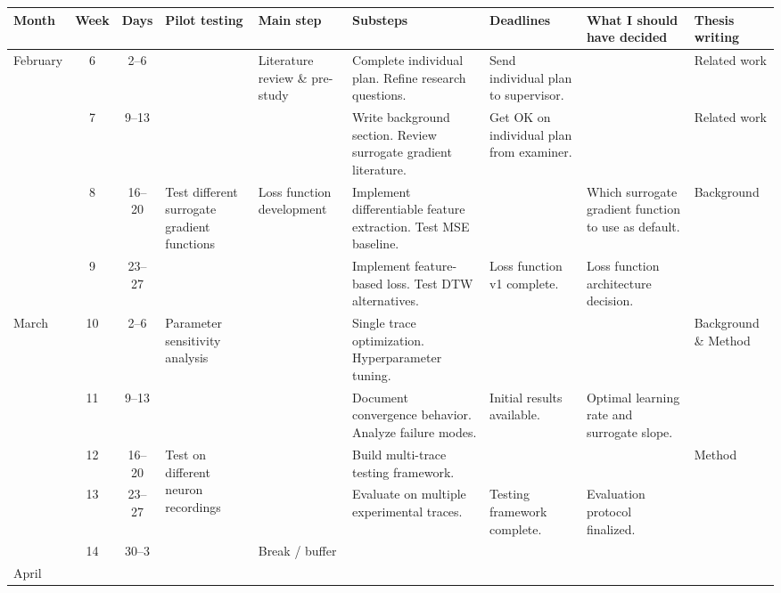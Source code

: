 \documentclass{article}
\begin{document}
\begin{table}[ht]
\centering
\footnotesize
\setlength{\tabcolsep}{3pt}
\begin{tabular}{|p{1.1cm}|c|c|p{2.2cm}|p{2.2cm}|p{2.2cm}|p{2.2cm}|p{2.2cm}|p{2.2cm}|}
\hline
\textbf{Month} & \textbf{Week} & \textbf{Days} & \textbf{Pilot testing} & \textbf{Main step} & \textbf{Substeps} & \textbf{Deadlines} & \textbf{What I should have decided} & \textbf{Thesis writing} \\
\hline
\multirow{4}{*}{February}
& 6 & 2--6 & & \multirow{2}{*}{\parbox{2.2cm}{Literature review \& pre-study}} & Complete individual plan. Refine research questions. & Send individual plan to supervisor. & & Related work \\
\cline{2-4}\cline{6-9}
& 7 & 9--13 & & & Write background section. Review surrogate gradient literature. & Get OK on individual plan from examiner. & & Related work \\
\cline{2-9}
& 8 & 16--20 & \multirow{2}{*}{\parbox{2.2cm}{Test different surrogate gradient functions}} & \multirow{4}{*}{\parbox{2.2cm}{Loss function development}} & Implement differentiable feature extraction. Test MSE baseline. & & Which surrogate gradient function to use as default. & \multirow{2}{*}{Background} \\
\cline{2-3}\cline{6-8}
& 9 & 23--27 & & & Implement feature-based loss. Test DTW alternatives. & Loss function v1 complete. & Loss function architecture decision. & \\
\hline
\multirow{5}{*}{March}
& 10 & 2--6 & \multirow{2}{*}{\parbox{2.2cm}{Parameter sensitivity analysis}} & \multirow{4}{*}{\parbox{2.2cm}{Optimization experiments}} & Single trace optimization. Hyperparameter tuning. & & & \multirow{2}{*}{\parbox{2.2cm}{Background \& Method}} \\
\cline{2-3}\cline{6-8}
& 11 & 9--13 & & & Document convergence behavior. Analyze failure modes. & Initial results available. & Optimal learning rate and surrogate slope. & \\
\cline{2-4}\cline{6-9}
& 12 & 16--20 & \multirow{2}{*}{\parbox{2.2cm}{Test on different neuron recordings}} & & Build multi-trace testing framework. & & & \multirow{2}{*}{Method} \\
\cline{2-3}\cline{6-8}
& 13 & 23--27 & & & Evaluate on multiple experimental traces. & Testing framework complete. & Evaluation protocol finalized. & \\
\cline{2-9}
& 14 & 30--3 & & Break / buffer & & & & \\
\hline
\multirow{4}{*}{April}

\end{tabular}
\end{table}
\end{document}
